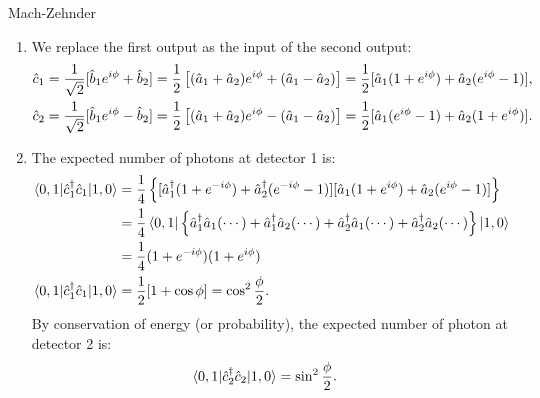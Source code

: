 \begin{example}{Mach-Zehnder}
\begin{enumerate}[itemsep=0pt,topsep=0pt,parsep=0pt,label=(\alph*)]
  The expected value at output 1 is:
  \begin{align*}
    _2\bra{0}_1\bra{1}\hb_1^\dagger\hb_1\ket{1}_1\ket{0}_2&=\frac{1}{2}\braket{0,1|(\ha_1^\dagger+\ha_2^\dagger)(\ha_1+\ha_2)|1,0}\\
    &=\frac{1}{2}\bra{0,1}(\ha_1^\dagger\ha_1+\ha_1^\dagger\ha_2+\ha_2^\dagger\ha_1+\ha_2^\dagger\ha_2)\ket{1,0}\\
    _2\bra{0}_1\bra{1}\hb_1^\dagger\hb_1\ket{1}_1\ket{0}_2&=\frac{1}{2}.
  \end{align*}
  Likewise, the expected value at output 2 is:
  \begin{align*}
    _2\bra{0}_1\bra{1}\hb_2^\dagger\hb_2\ket{1}_1\ket{0}_2&=\frac{1}{2}\braket{0,1|(\ha_1^\dagger-\ha_2^\dagger)(\ha_1-\ha_2)|1,0}\\
    &=\frac{1}{2}\bra{0,1}(\ha_1^\dagger\ha_1-\ha_1^\dagger\ha_2-\ha_2^\dagger\ha_1+\ha_2^\dagger\ha_2)\ket{1,0}\\
    _2\bra{0}_1\bra{1}\hb_2^\dagger\hb_2\ket{1}_1\ket{0}_2&=\frac{1}{2}.    
  \end{align*}
  \item We replace the first output as the input of the second output:
  \begin{align*}
    \hat{c}_1&=\frac{1}{\sqrt{2}}[\hat{b}_1e^{i\phi}+\hat{b}_2]=\frac{1}{2}\left[(\hat{a}_1+\hat{a}_2)e^{i\phi}+(\hat{a}_1-\hat{a}_2)\right]=\frac{1}{2}[\hat{a}_1(1+e^{i\phi})+\hat{a}_2(e^{i\phi}-1)],\\
    \hat{c}_2&=\frac{1}{\sqrt{2}}[\hat{b}_1e^{i\phi}-\hat{b}_2]=\frac{1}{2}\left[(\hat{a}_1+\hat{a}_2)e^{i\phi}-(\hat{a}_1-\hat{a}_2)\right]=\frac{1}{2}[\hat{a}_1(e^{i\phi}-1)+\hat{a}_2(1+e^{i\phi})].
  \end{align*}
  \item The expected number of photons at detector 1 is:
  \begin{align*}
    \langle0,1|\hat{c}_1^\dagger\hat{c}_1|1,0\rangle&=\frac{1}{4}\left\{[\hat{a}_1^\dagger(1+e^{-i\phi})+\hat{a}_2^\dagger(e^{-i\phi}-1)][\hat{a}_1(1+e^{i\phi})+\hat{a}_2(e^{i\phi}-1)]\right\}\\
    &=\frac{1}{4}\left\langle0,1\right|\left\{\hat{a}_1^\dagger\hat{a}_1(\cdots)+\hat{a}_1^\dagger\hat{a}_2(\cdots)+\hat{a}_2^\dagger\hat{a}_1(\cdots)+\hat{a}_2^\dagger\hat{a}_2(\cdots)\right\}\left|1,0\right\rangle\\
    &=\frac{1}{4}(1+e^{-i\phi})(1+e^{i\phi})\\
    \langle0,1|\hat{c}_1^\dagger\hat{c}_1|1,0\rangle&=\frac{1}{2}[1+\cos\phi]=\cos^2\frac{\phi}{2}.
  \end{align*}
  By conservation of energy (or probability), the expected number of photon at detector 2 is:
  \begin{align*}
    \langle0,1|\hat{c}_2^\dagger\hat{c}_2|1,0\rangle&=\sin^2\frac{\phi}{2}.
  \end{align*}
\end{enumerate}
\end{example}